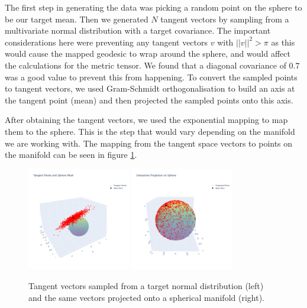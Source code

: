 \documentclass{article}
\begin{document}
The first step in generating the data was picking a random point on the sphere to be our target mean. Then we generated $N$ tangent vectors by sampling from a multivariate normal distribution with a target covariance. The important considerations here were preventing any tangent vectors $v$ with $\vert\vert v\vert\vert^2 > \pi$ as this would cause the mapped geodesic to wrap around the sphere, and would affect the calculations for the metric tensor. We found that a diagonal covariance of $0.7$ was a good value to prevent this from happening. To convert the sampled points to tangent vectors, we used Gram-Schmidt orthogonalisation to build an axis at the tangent point (mean) and then projected the sampled points onto this axis.

After obtaining the tangent vectors, we used the exponential mapping to map them to the sphere. This is the step that would vary depending on the manifold we are working with. The mapping from the tangent space vectors to points on the manifold can be seen in figure \ref{fig:tangent_norm}.

\begin{figure}[h]
    \centering
    \includegraphics[width=0.4\textwidth]{plots/tangent_norm.png}
    \includegraphics[width=0.4\textwidth]{plots/high_cov_proj.png}
    \caption{Tangent vectors sampled from a target normal distribution (left) and the same vectors projected onto a spherical manifold (right).}
    \label{fig:tangent_norm}
\end{figure}
\end{document}
